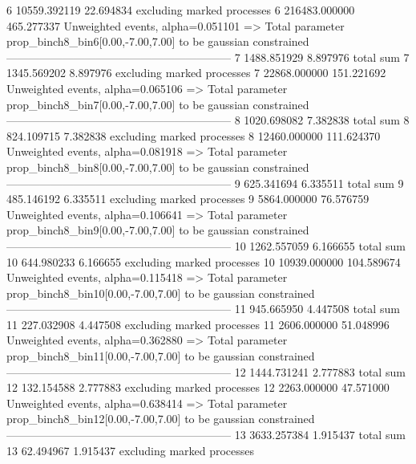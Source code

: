6          10559.392119    22.694834       excluding marked processes    
6          216483.000000   465.277337      Unweighted events, alpha=0.051101
  => Total parameter prop_binch8_bin6[0.00,-7.00,7.00] to be gaussian constrained
------------------------------------------------------------
7          1488.851929     8.897976        total sum                     
7          1345.569202     8.897976        excluding marked processes    
7          22868.000000    151.221692      Unweighted events, alpha=0.065106
  => Total parameter prop_binch8_bin7[0.00,-7.00,7.00] to be gaussian constrained
------------------------------------------------------------
8          1020.698082     7.382838        total sum                     
8          824.109715      7.382838        excluding marked processes    
8          12460.000000    111.624370      Unweighted events, alpha=0.081918
  => Total parameter prop_binch8_bin8[0.00,-7.00,7.00] to be gaussian constrained
------------------------------------------------------------
9          625.341694      6.335511        total sum                     
9          485.146192      6.335511        excluding marked processes    
9          5864.000000     76.576759       Unweighted events, alpha=0.106641
  => Total parameter prop_binch8_bin9[0.00,-7.00,7.00] to be gaussian constrained
------------------------------------------------------------
10         1262.557059     6.166655        total sum                     
10         644.980233      6.166655        excluding marked processes    
10         10939.000000    104.589674      Unweighted events, alpha=0.115418
  => Total parameter prop_binch8_bin10[0.00,-7.00,7.00] to be gaussian constrained
------------------------------------------------------------
11         945.665950      4.447508        total sum                     
11         227.032908      4.447508        excluding marked processes    
11         2606.000000     51.048996       Unweighted events, alpha=0.362880
  => Total parameter prop_binch8_bin11[0.00,-7.00,7.00] to be gaussian constrained
------------------------------------------------------------
12         1444.731241     2.777883        total sum                     
12         132.154588      2.777883        excluding marked processes    
12         2263.000000     47.571000       Unweighted events, alpha=0.638414
  => Total parameter prop_binch8_bin12[0.00,-7.00,7.00] to be gaussian constrained
------------------------------------------------------------
13         3633.257384     1.915437        total sum                     
13         62.494967       1.915437        excluding marked processes    
